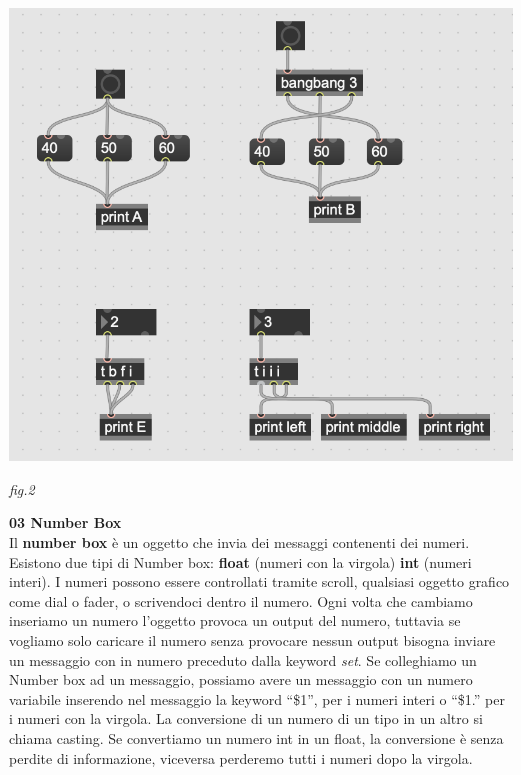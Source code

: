\documentclass[11pt]{article}
\begin{document}
\begin{multicols*}{2}
\begin{center}
\includegraphics[scale=0.3]{images/02_bang.png}

{\scriptsize \emph{fig.2 }}
\end{center}

\textbf{\textsf {03 Number Box}}\\

\noindent Il \textbf{number box} è un oggetto che invia dei messaggi contenenti dei numeri. Esistono due tipi di Number box: \textbf{float} (numeri con la virgola) \textbf{int} (numeri interi). I numeri possono essere controllati tramite scroll, qualsiasi oggetto grafico come dial o fader, o scrivendoci dentro il numero. Ogni volta che cambiamo inseriamo un numero l’oggetto provoca un output del numero, tuttavia se vogliamo solo caricare il numero senza provocare nessun output bisogna inviare un messaggio con in numero preceduto dalla keyword \textit{set}.
Se colleghiamo un Number box ad un messaggio, possiamo avere un messaggio con un numero variabile inserendo nel messaggio la keyword “\$1”, per i numeri interi o “\$1.” per i numeri con la virgola.
La conversione di un numero di un tipo in un altro si chiama casting. Se convertiamo un numero int in un float, la conversione è senza perdite di informazione, viceversa perderemo tutti i numeri dopo la virgola.


\end{multicols*}
\end{document}
